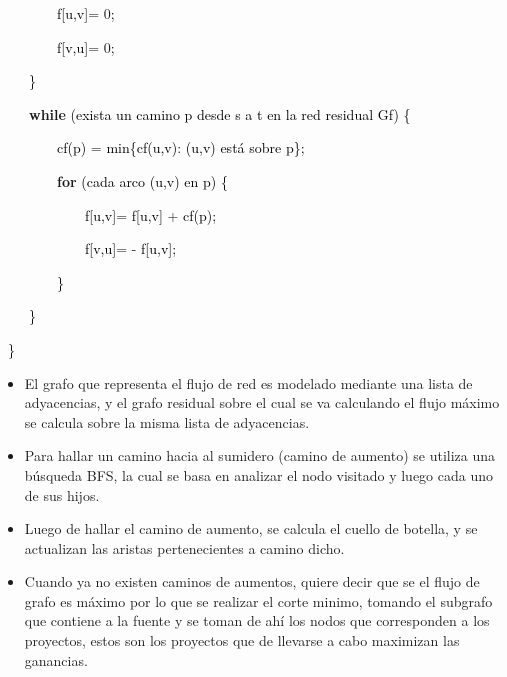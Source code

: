 \documentclass[a4paper,10pt]{article}
\begin{document}
\textcolor{black}{\ \ \ \ \ \ \ \ f[u,v]}\textcolor[rgb]{0.4,0.4,0.4}{=}\textcolor{black}{
}\textcolor[rgb]{0.4,0.4,0.4}{0}\textcolor{black}{; }

\textcolor{black}{\ \ \ \ \ \ \ \ f[v,u]}\textcolor[rgb]{0.4,0.4,0.4}{=}\textcolor{black}{
}\textcolor[rgb]{0.4,0.4,0.4}{0}\textcolor{black}{; }

\textcolor{black}{\ \ \ \ \} }

\textcolor{black}{\ \ \ \ }\textbf{\textcolor[rgb]{0.0,0.5019608,0.0}{while}}\textcolor{black}{ (exista un camino p
desde s a t en la red residual Gf) \{ }

\textcolor{black}{\ \ \ \ \ \ \ \ cf(p) }\textcolor[rgb]{0.4,0.4,0.4}{=}\textcolor{black}{
min\{cf(u,v)}\textcolor[rgb]{0.4,0.4,0.4}{:}\textcolor{black}{ (u,v) está sobre p\};}

\textcolor{black}{\ \ \ \ \ \ \ \ }\textbf{\textcolor[rgb]{0.0,0.5019608,0.0}{for}}\textcolor{black}{ (cada arco (u,v)
en p) \{ }

\textcolor{black}{\ \ \ \ \ \ \ \ \ \ \ \ f[u,v]}\textcolor[rgb]{0.4,0.4,0.4}{=}\textcolor{black}{ f[u,v]
}\textcolor[rgb]{0.4,0.4,0.4}{+}\textcolor{black}{ cf(p); }

\textcolor{black}{\ \ \ \ \ \ \ \ \ \ \ \ f[v,u]}\textcolor[rgb]{0.4,0.4,0.4}{=}\textcolor{black}{
}\textcolor[rgb]{0.4,0.4,0.4}{{}-}\textcolor{black}{ f[u,v]; }

\textcolor{black}{\ \ \ \ \ \ \ \ \} \ }

\textcolor{black}{\ \ \ \ \} }

\textcolor{black}{\ \}}


\bigskip


\begin{itemize}
\item El grafo que representa el flujo de red es modelado mediante una lista de adyacencias, y el
grafo residual sobre el cual se va calculando el flujo máximo se calcula sobre la misma lista de adyacencias.
\item Para hallar un camino hacia al sumidero (camino de aumento) se utiliza una búsqueda BFS, la cual se basa en analizar el nodo visitado y luego cada uno de sus hijos.
\item Luego de hallar el camino de aumento, se calcula el cuello de botella, y se actualizan las
aristas pertenecientes a camino dicho.
\item Cuando ya no existen caminos de aumentos, quiere decir que se el flujo de grafo es máximo por lo
que se realizar el corte minimo, tomando el subgrafo que contiene a la fuente y se toman de ahí los nodos que
corresponden a los proyectos, estos son los proyectos que de llevarse a cabo maximizan las ganancias.
\end{itemize}
\end{document}
